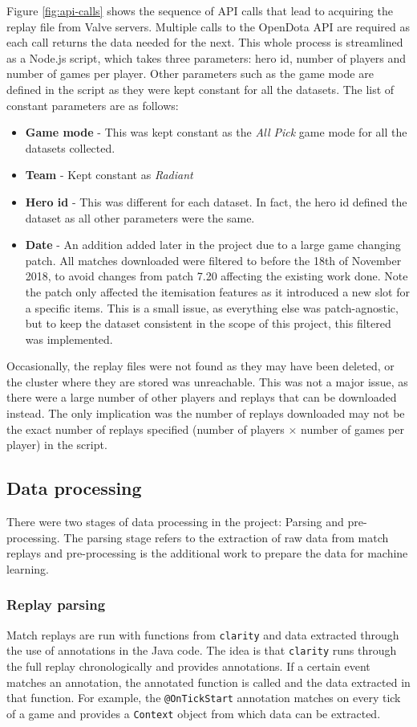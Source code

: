 \documentclass[Report.tex]{subfiles}
\begin{document}
Figure \ref{fig:api-calls} shows the sequence of API calls that lead to acquiring the replay file from Valve servers. Multiple calls to the OpenDota API are required as each call returns the data needed for the next. This whole process is streamlined as a Node.js script, which takes three parameters: hero id, number of players and number of games per player. Other parameters such as the game mode are defined in the script as they were kept constant for all the datasets. The list of constant parameters are as follows:
\begin{itemize}
\item \textbf{Game mode} - This was kept constant as the \textit{All Pick} game mode for all the datasets collected.
\item \textbf{Team} - Kept constant as \textit{Radiant}
\item \textbf{Hero id} - This was different for each dataset. In fact, the hero id defined the dataset as all other parameters were the same. 
\item \textbf{Date} - An addition added later in the project due to a large game changing patch. All matches downloaded were filtered to before the 18th of November 2018, to avoid changes from patch 7.20 affecting the existing work done. Note the patch only affected the itemisation features as it introduced a new slot for a specific items. This is a small issue, as everything else was patch-agnostic, but to keep the dataset consistent in the scope of this project, this filtered was implemented. 
\end{itemize}
Occasionally, the replay files were not found as they may have been deleted, or the cluster where they are stored was unreachable. This was not a major issue, as there were a large number of other players and replays that can be downloaded instead. The only implication was the number of replays downloaded may not be the exact number of replays specified (number of players $\times$ number of games per player) in the script. 

\subsection{Data processing}
There were two stages of data processing in the project: Parsing and pre-processing. The parsing stage refers to the extraction of raw data from match replays and pre-processing is the additional work to prepare the data for machine learning. 
\subsubsection{Replay parsing}
Match replays are run with functions from \texttt{clarity} and data extracted through the use of annotations in the Java code. The idea is that \texttt{clarity} runs through the full replay chronologically and provides annotations. If a certain event matches an annotation, the annotated function is called and the data extracted in that function. For example, the \texttt{@OnTickStart} annotation matches on every tick of a game and provides a \texttt{Context} object from which data can be extracted. 
\end{document}
